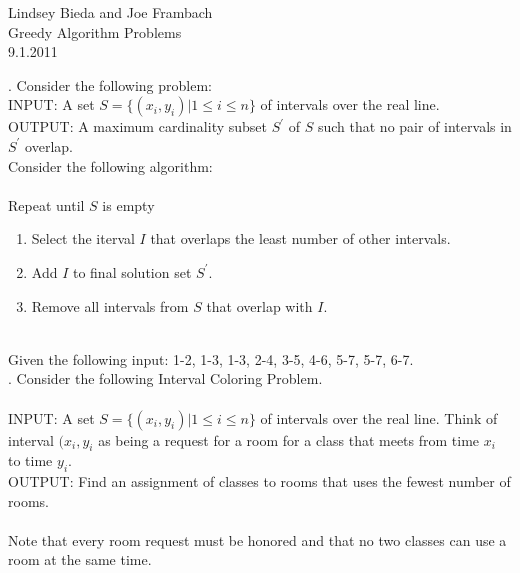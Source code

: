 \documentclass[10pt]{article}
\begin{document}
	\begin{flushright}
	Lindsey Bieda and Joe Frambach\\
	Greedy Algorithm Problems\\
	9.1.2011
	\end{flushright}
	. Consider the following problem:\\ 
	INPUT: A set $ S = \{(x_{i},y_{i})| 1\leq i \leq n\} $ of intervals over the real line.\\
	OUTPUT: A maximum cardinality subset $S^{\prime}$ of $S$ such that no pair of intervals in $S^{\prime}$ overlap. \\
	Consider the following algorithm:\\
	\\
	Repeat until $S$ is empty
	\begin{enumerate}
		\item Select the iterval $I$ that overlaps the least number of other intervals.
		\item Add $I$ to final solution set $S^{\prime}$.
		\item Remove all intervals from $S$ that overlap with $I$.
	\end{enumerate}
	\\
	Given the following input:  1-2, 1-3, 1-3, 2-4, 3-5, 4-6, 5-7, 5-7, 6-7.
	\\
	. Consider the following Interval Coloring Problem.\\
	\\
	INPUT: A set $ S = \{(x_{i},y_{i})| 1\leq i \leq n\} $ of intervals over the real line. 
	Think of interval $(x_{i},y_{i}$ as being a request for a room for a class that meets from 
	time $x_{i}$ to time $y_{i}$.\\
	OUTPUT: Find an assignment of classes to rooms that uses the fewest number of rooms.\\
	\\
	Note that every room request must be honored and that no two classes can use a room at the
	same time. 
\end{document}
